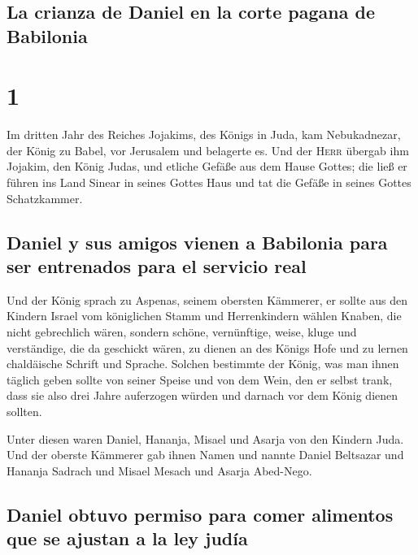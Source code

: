 \hypertarget{la-crianza-de-daniel-en-la-corte-pagana-de-babilonia}{%
\subsection{La crianza de Daniel en la corte pagana de
Babilonia}\label{la-crianza-de-daniel-en-la-corte-pagana-de-babilonia}}

\hypertarget{section}{%
\section{1}\label{section}}

 Im dritten Jahr des Reiches Jojakims, des Königs in Juda,
kam Nebukadnezar, der König zu Babel, vor Jerusalem und belagerte es.
 Und der \textsc{Herr} übergab ihm Jojakim, den König
Judas, und etliche Gefäße aus dem Hause Gottes; die ließ er führen ins
Land Sinear in seines Gottes Haus und tat die Gefäße in seines Gottes
Schatzkammer.

\hypertarget{daniel-y-sus-amigos-vienen-a-babilonia-para-ser-entrenados-para-el-servicio-real}{%
\subsection{Daniel y sus amigos vienen a Babilonia para ser entrenados
para el servicio
real}\label{daniel-y-sus-amigos-vienen-a-babilonia-para-ser-entrenados-para-el-servicio-real}}

 Und der König sprach zu Aspenas, seinem obersten
Kämmerer, er sollte aus den Kindern Israel vom königlichen Stamm und
Herrenkindern wählen  Knaben, die nicht gebrechlich wären,
sondern schöne, vernünftige, weise, kluge und verständige, die da
geschickt wären, zu dienen an des Königs Hofe und zu lernen chaldäische
Schrift und Sprache.  Solchen bestimmte der König, was man
ihnen täglich geben sollte von seiner Speise und von dem Wein, den er
selbst trank, dass sie also drei Jahre auferzogen würden und darnach vor
dem König dienen sollten.

 Unter diesen waren Daniel, Hananja, Misael und Asarja von
den Kindern Juda.  Und der oberste Kämmerer gab ihnen
Namen und nannte Daniel Beltsazar und Hananja Sadrach und Misael Mesach
und Asarja Abed-Nego.

\hypertarget{daniel-obtuvo-permiso-para-comer-alimentos-que-se-ajustan-a-la-ley-juduxeda}{%
\subsection{Daniel obtuvo permiso para comer alimentos que se ajustan a
la ley
judía}\label{daniel-obtuvo-permiso-para-comer-alimentos-que-se-ajustan-a-la-ley-juduxeda}}

